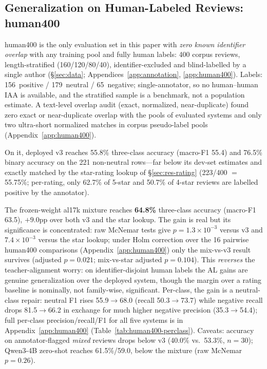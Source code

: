 \subsection{Generalization on Human-Labeled Reviews: human400}
\label{sec:res-human400}

human400 is the only evaluation set in this paper with \emph{zero
known identifier overlap} with any training pool and fully human
labels: 400 corpus reviews, length-stratified (160/120/80/40),
identifier-excluded and blind-labelled by a single author
(\S\ref{sec:data}; Appendices~\ref{app:annotation}, \ref{app:human400}).
Labels: 156~positive / 179~neutral / 65~negative; single-annotator,
so no human--human IAA is available, and the stratified sample is a
benchmark, not a population estimate. A text-level overlap audit
(exact, normalized, near-duplicate) found zero exact or
near-duplicate overlap with the pools of evaluated systems and only
two ultra-short normalized matches in corpus pseudo-label pools
(Appendix~\ref{app:human400}).

On it, deployed v3 reaches 55.8\% three-class accuracy (macro-F1
55.4) and 76.5\% binary accuracy on the 221 non-neutral rows---far
below its dev-set estimates and exactly matched by the star-rating
lookup of \S\ref{sec:res-rating} (223/400 $=$ 55.75\%; per-rating,
only 62.7\% of 5-star and 50.7\% of 4-star reviews are labelled
positive by the annotator).

The frozen-weight al17k mixture reaches \textbf{64.8\%} three-class
accuracy (macro-F1 63.5), $+9.0$pp over both v3 and the star lookup.
The gain is real but its significance is concentrated: raw McNemar
tests give $p{=}1.3{\times}10^{-3}$ versus v3 and $7.4{\times}10^{-3}$
versus the star lookup; under Holm correction over the 16 pairwise
human400 comparisons (Appendix~\ref{app:human400}) only the
mix-vs-v3 result survives (adjusted $p{=}0.021$; mix-vs-star
adjusted $p{=}0.104$). This \emph{reverses} the teacher-alignment
worry: on identifier-disjoint human labels the AL gains are genuine
generalization over the deployed system, though the margin over a
rating baseline is nominally, not family-wise, significant.
Per-class, the gain is a neutral-class repair: neutral F1
rises 55.9$\to$68.0 (recall 50.3$\to$73.7) while negative recall
drops 81.5$\to$66.2 in exchange for much higher negative precision
(35.3$\to$54.4); full per-class precision/recall/F1 for all five
systems is in Appendix~\ref{app:human400}
(Table~\ref{tab:human400-perclass}). Caveats: accuracy on
annotator-flagged \emph{mixed} reviews drops below v3 (40.0\% vs.\
53.3\%, $n{=}30$); Qwen3-4B zero-shot reaches 61.5\%/59.0, below the
mixture (raw McNemar $p{=}0.26$).


